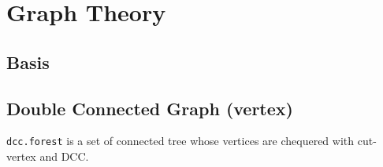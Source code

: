 \chapter{Graph Theory}
\section{Basis}

\section{Double Connected Graph (vertex)}
\texttt{dcc.forest} is a set of connected tree whose vertices are chequered with cut-vertex and DCC.

